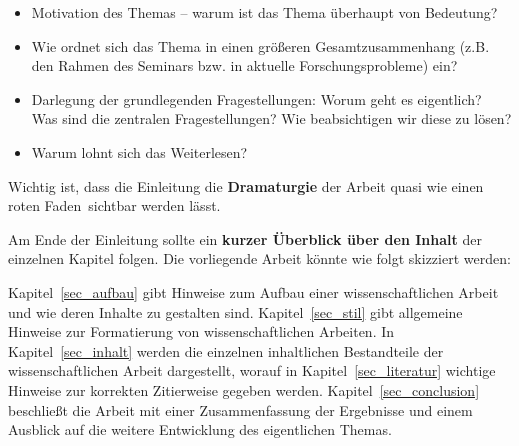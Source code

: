 \begin{itemize}
\item Motivation des Themas -- warum ist das Thema überhaupt von Bedeutung?
\item Wie ordnet sich das Thema in einen größeren Gesamtzusammenhang (z.B. den Rahmen des Seminars bzw. in aktuelle Forschungsprobleme) ein?
\item Darlegung der grundlegenden Fragestellungen: 
Worum geht es eigentlich? Was sind die zentralen Fragestellungen? Wie beabsichtigen wir diese zu lösen?
\item Warum lohnt sich das Weiterlesen? 
\end{itemize}
Wichtig ist, dass die Einleitung die {\bf Dramaturgie} der Arbeit quasi wie einen \glqq roten Faden\grqq\, sichtbar werden lässt.

\bigskip

Am Ende der Einleitung sollte ein \textbf{kurzer Überblick über den Inhalt} der einzelnen Kapitel folgen. 
Die vorliegende Arbeit könnte wie folgt skizziert werden:

\bigskip

Kapitel~\ref{sec_aufbau} gibt Hinweise zum Aufbau einer wissenschaftlichen Arbeit und wie deren Inhalte zu gestalten sind.
Kapitel~\ref{sec_stil} gibt allgemeine Hinweise zur Formatierung von wissenschaftlichen Arbeiten.
In Kapitel~\ref{sec_inhalt} werden die einzelnen inhaltlichen Bestandteile der wissenschaftlichen Arbeit dargestellt, worauf in Kapitel~\ref{sec_literatur} wichtige Hinweise zur korrekten Zitierweise gegeben werden.
Kapitel~\ref{sec_conclusion} beschließt die Arbeit mit einer Zusammenfassung der Ergebnisse und einem Ausblick auf die weitere Entwicklung des eigentlichen Themas.


